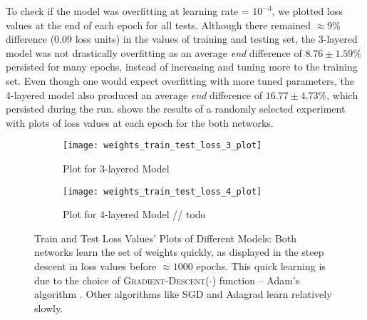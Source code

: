 To check if the model was overfitting at learning rate = $10^{-3}$, we plotted loss values at the end of each epoch for all tests. Although there remained $\approx 9\%$ difference (0.09 loss units) in the values of training and testing set, the 3-layered model was not drastically overfitting as an average \textit{end} difference of $8.76 \pm 1.59$\% persisted for many epochs, instead of increasing and tuning more to the training set. Even though one would expect overfitting with more tuned parameters, the 4-layered model also  produced an average \textit{end} difference of $16.77 \pm 4.73\%$, which persisted during the run.  shows the results of a randomly selected experiment with plots of loss values at each epoch for the both networks.
\begin{figure}[!htbp]
    \centering
    \begin{subfigure}{.49\textwidth}
        \centering
        \texttt{[image: weights\_train\_test\_loss\_3\_plot]}
        \caption{Plot for 3-layered Model}
        \label{fig:Plot for 3-layered Model}
    \end{subfigure}
    \begin{subfigure}{.49\textwidth}
        \centering
        \texttt{[image: weights\_train\_test\_loss\_4\_plot]}
        \caption{Plot for 4-layered Model // todo}
        \label{fig:Plot for 4-layered Model}
    \end{subfigure}
    \caption[Train and Test Loss Values' Plots of Different Models]{Train and Test Loss Values' Plots of Different Models: Both networks learn the set of weights quickly, as displayed in the steep descent in loss values before $\approx 1000$ epochs. This quick learning is due to the choice of \textsc{Gradient-Descent}($\cdot$) function -- Adam's algorithm \cite{Adam}. Other algorithms like SGD \cite{SGD} and Adagrad \cite{Adagrad} learn relatively slowly.}
    \label{fig:Train & Test Loss Values' Plots of Different Models}
\end{figure}

